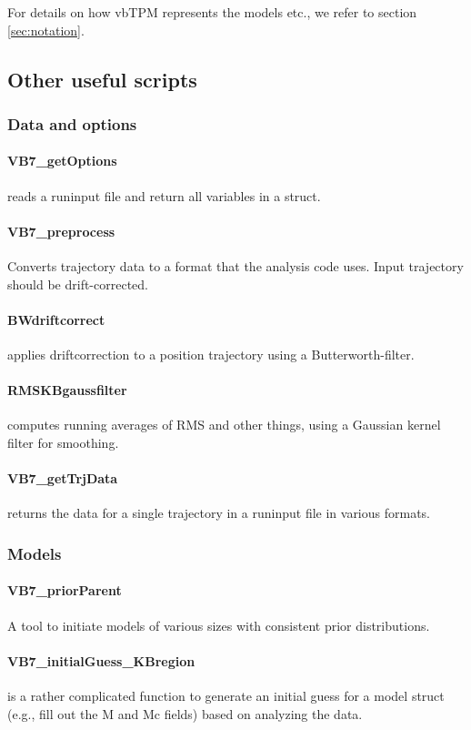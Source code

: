 For details on how vbTPM represents the models etc., we refer to
section \ref{sec:notation}.

\subsection{Other useful scripts}
\subsubsection{Data and options}
\paragraph{VB7\_getOptions} 
reads a runinput file and return all variables in a struct.
\paragraph{VB7\_preprocess} 
Converts trajectory data to a format that the analysis code
uses. Input trajectory should be drift-corrected.
\paragraph{BWdriftcorrect}
applies driftcorrection to a position trajectory using a Butterworth-filter.
\paragraph{RMSKBgaussfilter}
computes running averages of RMS and other things, using a Gaussian
kernel filter for smoothing.
\paragraph{VB7\_getTrjData} 
returns the data for a single trajectory in a runinput file in various
formats.

\subsubsection{Models}
\paragraph{VB7\_priorParent} 
A tool to initiate models of various sizes with consistent prior
distributions.
\paragraph{VB7\_initialGuess\_KBregion} 
is a rather complicated function to generate an initial guess for a
model struct (e.g., fill out the M and Mc fields) based on analyzing
the data.
